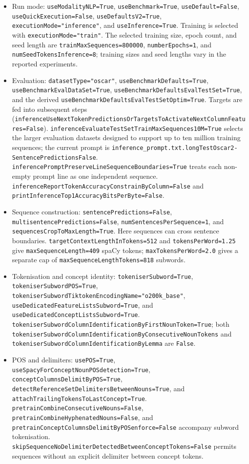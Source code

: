 \begin{itemize}
	\item Run mode: \texttt{useModalityNLP=True}, \texttt{useBenchmark=True}, \texttt{useDefault=False}, \texttt{useQuickExecution=False}, \texttt{useDefaultsV2=True}, \texttt{executionMode="inference"}, and \texttt{useInference=True}. Training is selected with \texttt{executionMode="train"}. The selected training size, epoch count, and seed length are \texttt{trainMaxSequences=800000}, \texttt{numberEpochs=1}, and \texttt{numSeedTokensInference=8}; training sizes and seed lengths vary in the reported experiments.
	\item Evaluation: \texttt{datasetType="oscar"}, \texttt{useBenchmarkDefaults=True}, \texttt{useBenchmarkEvalDataSet=True}, \texttt{useBenchmarkDefaultsEvalTestSet=True}, and the derived \texttt{useBenchmarkDefaultsEvalTestSetOptim=True}. Targets are fed into subsequent steps (\texttt{inferenceUseNextTokenPredictionsOrTargetsToActivateNextColumnFeatures=False}). \texttt{inferenceEvaluateTestSetTrainMaxSequences10M=True} selects the larger evaluation datasets designed to support up to ten million training sequences; the current prompt is \texttt{inference_prompt.txt.longTestOscar2-SentencePredictionsFalse}. \texttt{inferencePromptPreserveLineSequenceBoundaries=True} treats each non-empty prompt line as one independent sequence. \texttt{inferenceReportTokenAccuracyConstrainByColumn=False} and \texttt{printInferenceTop1AccuracyBitsPerByte=False}.
	\item Sequence construction: \texttt{sentencePredictions=False}, \texttt{multisentencePredictions=False}, \texttt{numSentencesPerSequence=1}, and \texttt{sequencesCropToMaxLength=True}. Here sequences can cross sentence boundaries. \texttt{targetContextLengthInTokens=512} and \texttt{tokensPerWord=1.25} give \texttt{maxSequenceLength=409} spaCy tokens; \texttt{maxTokensPerWord=2.0} gives a separate cap of \texttt{maxSequenceLengthTokens=818} subwords.
	\item Tokenisation and concept identity: \texttt{tokeniserSubword=True}, \texttt{tokeniserSubwordPOS=True}, \texttt{tokeniserSubwordTiktokenEncodingName="o200k_base"}, \texttt{useDedicatedFeatureListsSubword=True}, and \texttt{useDedicatedConceptListsSubword=True}. \texttt{tokeniserSubwordColumnIdentificationByFirstNounToken=True}; both \texttt{tokeniserSubwordColumnIdentificationByConsecutiveNounTokens} and \texttt{tokeniserSubwordColumnIdentificationByLemma} are \texttt{False}.
	\item POS and delimiters: \texttt{usePOS=True}, \texttt{useSpacyForConceptNounPOSdetection=True}, \texttt{conceptColumnsDelimitByPOS=True}, \texttt{detectReferenceSetDelimitersBetweenNouns=True}, and \texttt{attachTrailingTokensToLastConcept=True}. \texttt{pretrainCombineConsecutiveNouns=False}, \texttt{pretrainCombineHyphenatedNouns=False}, and \texttt{pretrainConceptColumnsDelimitByPOSenforce=False} accompany subword tokenisation. \texttt{skipSequenceNoDelimiterDetectedBetweenConceptTokens=False} permits sequences without an explicit delimiter between concept tokens.

\end{itemize}
